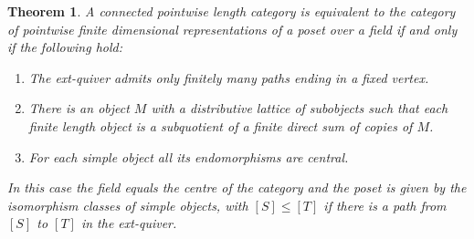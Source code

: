 \documentclass[10pt,a4paper]{amsart}
\newtheorem{thm}{Theorem}
\begin{document}
\begin{thm}\label{th:main2}
  A connected pointwise length category is equivalent to the category
  of pointwise finite dimensional representations of a poset over a
  field if and only if the following hold:
  \begin{enumerate}
  \item[(L1)] The ext-quiver admits only finitely many paths ending in a fixed vertex. 
  \item[(L2)] There is an object $M$ with a distributive lattice of
    subobjects such that each  finite length object is a subquotient of a finite
    direct sum of copies of $M$.
  \item[(L3)] For each simple object all its endomorphisms are central. 
\end{enumerate}
In this case the field equals the centre of the category and the poset is
given by the isomorphism classes of simple objects, with $[S]\le [T]$
if there is a path from $[S]$ to $[T]$ in the ext-quiver.
\end{thm}
\end{document}
